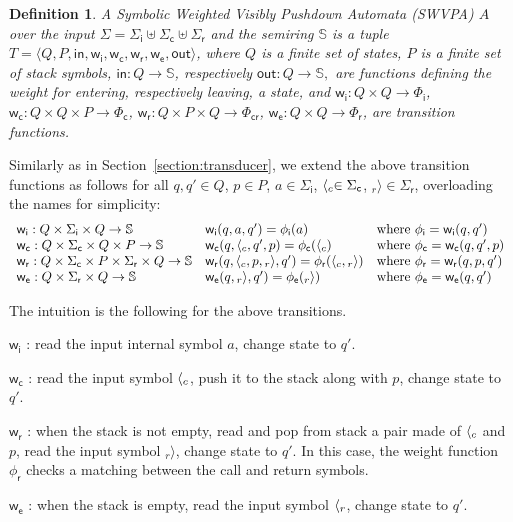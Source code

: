 \documentclass[a4paper,11pt]{article}
\newtheorem{definition}[theorem]{Definition}
\def\<#1>{\langle #1 \rangle}
\newcommand{\Semiring}{\mathbb{S}}
\def\SWVPA{\textsf{SWVPA}\xspace}
\def\wei{\mathsf{w}}
\def\init{\mathsf{in}}
\def\final{\mathsf{out}}
\newcommand{\call}[1]{\ensuremath \langle_{#1}}
\newcommand{\return}[1]{\ensuremath {}_{#1}{\rangle}} %
\def\Sigmai{{\Sigma_\mathsf{i}}}
\def\Sigmac{{\Sigma_\mathsf{c}}}
\def\Sigmar{{\Sigma_\mathsf{r}}}
\def\Phii{{\Phi_\mathsf{i}}}
\def\Phic{{\Phi_\mathsf{c}}}
\def\Phir{{\Phi_\mathsf{r}}}
\def\Phicr{{\Phi_\mathsf{cr}}}
\def\weii{{\wei_\mathsf{i}}}
\def\weic{{\wei_\mathsf{c}}}
\def\weir{{\wei_\mathsf{r}}}
\def\weie{{\wei_\mathsf{e}}}
\begin{document}
\begin{definition}
A \emph{Symbolic Weighted Visibly Pushdown Automata} (\SWVPA) $A$ 
over the input $\Sigma = \Sigmai \uplus \Sigmac \uplus \Sigmar$
and the semiring $\Semiring$ is a tuple
$T = \< Q, P, \init, \weii, \weic, \weir, \weie, \final >$,
where $Q$ is a finite set of states, 
$P$ is a finite set of stack symbols, 
$\mathsf{in} : Q \to \Semiring$, 
respectively $\mathsf{out} : Q \to \Semiring,$
are functions defining the weight for entering, 
respectively leaving, a state, 
and 
$\weii : Q \times Q \to \Phii$,  
$\weic : Q \times Q \times P \to \Phic$,  
$\weir : Q \times P \times Q \to \Phicr$,  
$\weie : Q \times Q \to \Phir$,  
are transition functions.
\end{definition}
%
Similarly as in Section~\ref{section:transducer}, 
we extend the above transition functions as follows
for all $q, q' \in Q$, $p \in P$, 
$a \in \Sigmai$, 
$\call{c} \in \Sigmac$, 
$\return{r} \in \Sigmar$, 
overloading the names for simplicity:
\[
\begin{array}{lll}
\weii: Q \times \Sigmai \times Q \to \Semiring & 
\weii(q, a, q') = \phi_\mathsf{i}(a) & 
\mathrm{where~} \phi_\mathsf{i} = \weii(q, q')\\
%
\weic: Q \times \Sigmac \times Q \times P \to \Semiring & 
\weic(q, \call{c}, q', p) = \phi_\mathsf{c}(\call{c}) & 
\mathrm{where~} \phi_\mathsf{c} = \weic(q, q', p)\\
%
\weir: Q \times \Sigmac \times P \times \Sigmar \times Q \to \Semiring & 
\weir(q, {\call{c}},  p, {\return{r}}, q') = \phi_\mathsf{r}({\call{c}},  {\return{r}}) & 
\mathrm{where~} \phi_\mathsf{r} = \weir(q, p, q')\\
%
\weie: Q \times \Sigmar \times Q \to \Semiring & 
\weie(q, {\return{r}}, q') = \phi_\mathsf{e}({\return{r}}) &
\mathrm{where~} \phi_\mathsf{e} = \weie(q, q')\\
\end{array}      
\]

\noindent
The intuition is the following for the above transitions.
\begin{description}
\item $\weii$ : read the input internal symbol $a$, change state to $q'$.
\item $\weic$ : read the input symbol $\call{c}$, push it to the stack along with $p$, change state to $q'$.
\item $\weir$ : when the stack is not empty, 
      read and pop from stack a pair made of $\call{c}$ and $p$, 
      read the input symbol $\return{r}$, change state to $q'$.
      In this case, the weight function $\phi_\mathsf{r}$ checks a matching between the call and return symbols.
\item $\weie$ : when the stack is empty, 
      read the input symbol $\call{r}$, change state to $q'$.
\end{description}
\end{document}
